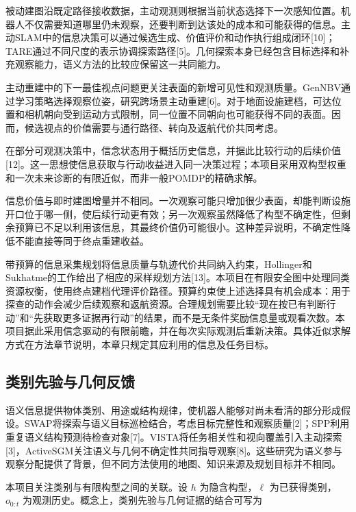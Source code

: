 \documentclass[11pt,a4paper]{article}
\numberwithin{equation}{section}
\begin{document}
被动建图沿既定路径接收数据，主动观测则根据当前状态选择下一次感知位置。机器人不仅需要知道哪里仍未观察，还要判断到达该处的成本和可能获得的信息。主动SLAM中的信息决策可以通过候选生成、价值评价和动作执行组成闭环{[}10{]}；TARE通过不同尺度的表示协调探索路径{[}5{]}。几何探索本身已经包含目标选择和补充观察能力，语义方法的比较应保留这一共同能力。

主动重建中的下一最佳视点问题更关注表面的新增可见性和观测质量。GenNBV通过学习策略选择观察位姿，研究跨场景主动重建{[}6{]}。对于地面设施建档，可达位置和相机朝向受到运动方式限制，同一位置不同朝向也可能获得不同的表面。因而，候选视点的价值需要与通行路径、转向及返航代价共同考虑。

在部分可观测决策中，信念状态用于概括历史信息，并据此比较行动的后续价值{[}12{]}。这一思想使信息获取与行动收益进入同一决策过程；本项目采用双构型权重和一次未来诊断的有限近似，而非一般POMDP的精确求解。

信息价值与即时建图增量并不相同。一次观察可能只增加很少表面，却能判断设施开口位于哪一侧，使后续行动更有效；另一次观察虽然降低了构型不确定性，但剩余预算已不足以利用该信息，其最终价值仍可能很小。这种差异说明，不确定性降低不能直接等同于终点重建收益。

带预算的信息采集规划将信息质量与轨迹代价共同纳入约束，Hollinger和Sukhatme的工作给出了相应的采样规划方法{[}13{]}。本项目在有限安全图中处理同类资源权衡，使用终点建档代理评价路径。预算约束使上述选择具有机会成本：用于探查的动作会减少后续观察和返航资源。合理规划需要比较``现在按已有判断行动''和``先获取更多证据再行动''的结果，而不是无条件奖励信息量或观看次数。本项目据此采用信念驱动的有限前瞻，并在每次实际观测后重新决策。具体近似求解方式在方法章节说明，本章只规定其应利用的信息及任务目标。

\hypertarget{ux7c7bux522bux5148ux9a8cux4e0eux51e0ux4f55ux53cdux9988}{%
\subsection{类别先验与几何反馈}\label{ux7c7bux522bux5148ux9a8cux4e0eux51e0ux4f55ux53cdux9988}}

语义信息提供物体类别、用途或结构规律，使机器人能够对尚未看清的部分形成假设。SWAP将探索与语义目标巡检结合，考虑目标完整性和观察质量{[}2{]}；SPP利用重复语义结构预测待检查对象{[}7{]}。VISTA将任务相关性和视向覆盖引入主动探索{[}3{]}，ActiveSGM关注语义与几何不确定性共同指导观察{[}8{]}。这些研究为语义参与观察分配提供了背景，但不同方法使用的地图、知识来源及规划目标并不相同。

本项目关注类别与有限构型之间的关联。设 \(h\) 为隐含构型，\(\ell\) 为已获得类别，\(o_{0:t}\) 为观测历史。概念上，类别先验与几何证据的结合可写为
\end{document}
